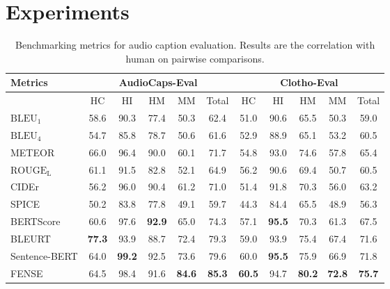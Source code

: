 \documentclass{article}
\begin{document}
\section{Experiments}
\label{sec:experiments}

\begin{table}[t]
\centering
    \begin{tabular}{l|c|c|c|c|c||c|c|c|c|c} \toprule
             Metrics     & \multicolumn{5}{c||}{AudioCaps-Eval} & \multicolumn{5}{c}{Clotho-Eval}   \\  \hline
          & HC    & HI   & HM   & MM   & Total & HC   & HI   & HM   & MM   & Total \\  \hline
    $\text{BLEU}_\text{1}$        & 58.6  & 90.3 & 77.4 & 50.3 & 62.4  & 51.0 & 90.6 & 65.5 & 50.3 & 59.0  \\
    $\text{BLEU}_\text{4}$        & 54.7  & 85.8 & 78.7 & 50.6 & 61.6  & 52.9 & 88.9 & 65.1 & 53.2 & 60.5  \\
    METEOR        & 66.0 & 96.4 & 90.0 & 60.1 & 71.7  & 54.8 & 93.0 & 74.6 & 57.8 & 65.4  \\
    $\text{ROUGE}_\text{L}$       & 61.1  & 91.5 & 82.8 & 52.1 & 64.9  & 56.2 & 90.6 & 69.4 & 50.7 & 60.5  \\  \hline
    CIDEr         & 56.2  & 96.0 & 90.4 & 61.2 & 71.0  & 51.4 & 91.8 & 70.3 & 56.0 & 63.2  \\  
    SPICE         & 50.2  & 83.8 & 77.8 & 49.1 & 59.7  & 44.3 & 84.4 & 65.5 & 48.9 & 56.3  \\  \hline
    BERTScore     & 60.6  & 97.6 & \textbf{92.9} & 65.0 & 74.3  & 57.1 & \textbf{95.5} & 70.3 & 61.3 & 67.5  \\
    BLEURT        & \textbf{77.3}  & 93.9 & 88.7 & 72.4 & 79.3  & 59.0 & 93.9 & 75.4 & 67.4 & 71.6  \\
    Sentence-BERT & 64.0  & \textbf{99.2} & 92.5 & 73.6 & 79.6  & 60.0 & \textbf{95.5} & 75.9 & 66.9 & 71.8  \\  \hline
    FENSE        & 64.5  & 98.4 & 91.6 & \textbf{84.6} & \textbf{85.3}  & \textbf{60.5} & 94.7 & \textbf{80.2} & \textbf{72.8} & \textbf{75.7} \\ \bottomrule
    \end{tabular}
    \caption{Benchmarking metrics for audio caption evaluation. Results are the correlation with human on pairwise comparisons.}
    \label{tab:all_results}
\end{table}
\end{document}
